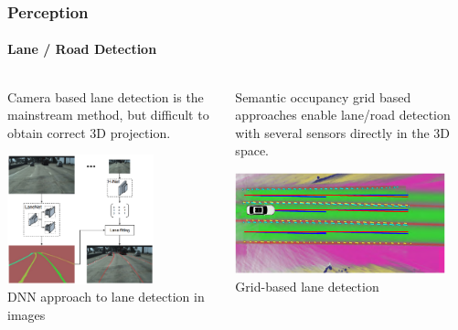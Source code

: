 \begin{frame}
\frametitle{Perception}
\framesubtitle{Lane / Road Detection}
\begin{columns}[T]
    \begin{column}{0.5\textwidth}
        Camera based lane detection is the mainstream method, but difficult
        to obtain correct 3D projection.
        \begin{center}
        \includegraphics[width=0.7\textwidth]{images/lane_detection_vision.png}\\
        \footnotesize  DNN approach to lane detection in images \cite{Neven2018-om}
        \end{center}
    \end{column}
    \begin{column}{0.5\textwidth}
        Semantic occupancy grid based approaches enable lane/road detection
        with several sensors directly in the 3D space.
        \begin{center}
        \includegraphics[width=0.9\textwidth]{images/thomas_semantic_grids.png}\\
        \footnotesize Grid-based lane detection \cite{Thomas2021-mi}
        \end{center}
    \end{column}
\end{columns}
\end{frame}

